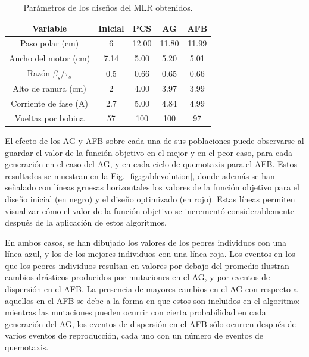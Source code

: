 \begin{table}[t]
\centering
\caption{Parámetros de los diseños del MLR obtenidos.}
\label{table:designsparams}
\begin{tabular}{c c c c c}\hline
Variable & Inicial & PCS & AG & AFB\\
\hline\hline
Paso polar (cm) & 6 & 12.00 & 11.80 & 11.99\\
Ancho del motor (cm) & 7.14 & 5.00 & 5.20 & 5.01\\
Razón $\beta_s/\tau_s$ & 0.5 & 0.66 & 0.65 & 0.66\\
Alto de ranura (cm) & 2 & 4.00 & 3.97 & 3.99\\
Corriente de fase (A) & 2.7 & 5.00 & 4.84 & 4.99\\
Vueltas por bobina & 57 & 100 & 100 & 97
\end{tabular}
\end{table}

El efecto de los AG y AFB sobre cada una de sus poblaciones puede observarse al guardar el valor de la función objetivo en el mejor y en el peor caso, para cada generación en el caso del AG, y en cada ciclo de quemotaxis para el AFB. Estos resultados se muestran en la Fig. \ref{fig:gabfevolution}, donde además se han señalado con líneas gruesas horizontales los valores de la función objetivo para el diseño inicial (en negro) y el diseño optimizado (en rojo). Estas líneas permiten visualizar cómo el valor de la función objetivo se incrementó considerablemente después de la aplicación de estos algoritmos.

En ambos casos, se han dibujado los valores de los peores individuos con una línea azul, y los de los mejores individuos con una línea roja. Los eventos en los que los peores individuos resultan en valores por debajo del promedio ilustran cambios drásticos producidos por mutaciones en el AG, y por eventos de dispersión en el AFB. La presencia de mayores cambios en el AG con respecto a aquellos en el AFB se debe a la forma en que estos son incluidos en el algoritmo: mientras las mutaciones pueden ocurrir con cierta probabilidad en cada generación del AG, los eventos de dispersión en el AFB sólo ocurren después de varios eventos de reproducción, cada uno con un número de eventos de quemotaxis.

